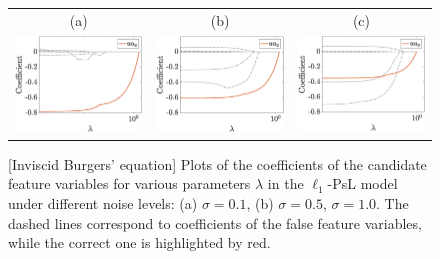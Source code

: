 \documentclass[a4paper,11pt]{article}
\begin{document}
\begin{figure}
\centering
\begin{tabular}{ccc}
(a)&(b)&(c)\\
\includegraphics[width=2in]{Figures/burgers_0_1.eps}&
\includegraphics[width=2in]{Figures/burgers_0_5.eps}&
\includegraphics[width=2in]{Figures/burgers_1.eps}
\end{tabular}	
\caption{[Inviscid Burgers' equation] Plots of the coefficients of the candidate feature variables for various parameters $\lambda$ in the $\ell_1$-PsL model under different noise levels: (a) $\sigma=0.1$, (b) $\sigma=0.5$, $\sigma=1.0$. The dashed lines correspond to coefficients of the false feature variables, while the correct one is highlighted by red.}\label{expr.burgers}
\end{figure}
\end{document}
